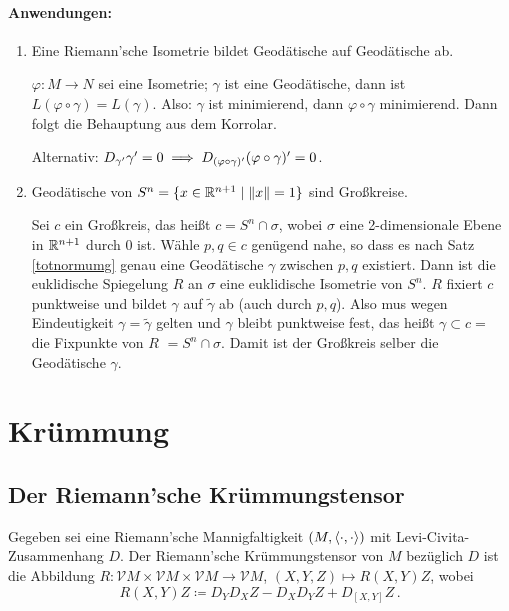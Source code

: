 \documentclass[a4paper,twoside,DIV15,BCOR12mm]{scrbook}
\renewcommand{\da}{\coloneqq}
\newcommand{\V}{\mathcal V}
\begin{document}
\subsubsection*{Anwendungen:}
\begin{enumerate}
\item Eine Riemann’sche Isometrie bildet Geodätische auf Geodätische ab.
\begin{beweis}
$\varphi: M \to N$ sei eine Isometrie; $\gamma$ ist eine Geodätische, dann ist $L(\varphi \circ \gamma) = L(\gamma)$. Also: $\gamma$ ist minimierend, dann $\varphi\circ \gamma$ minimierend. Dann folgt die Behauptung aus dem Korrolar.

Alternativ: $D_{\gamma'}{\gamma'} = 0 \implies D_{(\varphi\circ \gamma)'}(\varphi\circ\gamma)' = 0$.
\end{beweis}
\item Geodätische von $S^n=\{x \in \mathbb{R}^{n+1}\mid \|x\| = 1\}$ sind Großkreise.
\begin{beweis}
Sei $c$ ein Großkreis, das heißt $c = S^n \cap \sigma$, wobei $\sigma$ eine 2-dimensionale Ebene in $\mathbb{R}^{n+1}$ durch 0 ist. Wähle $p,q\in c$ genügend nahe, so dass es nach Satz \ref{totnormumg} genau eine Geodätische $\gamma$ zwischen $p,q$ existiert. Dann ist die euklidische Spiegelung $R$ an $\sigma$ eine euklidische Isometrie von $S^n$. $R$ fixiert $c$ punktweise und bildet $\gamma$  auf $\tilde\gamma$ ab (auch durch $p,q$). Also mus wegen Eindeutigkeit $\gamma = \tilde \gamma$ gelten und $\gamma$ bleibt punktweise fest, das heißt $\gamma\subset c = $ die Fixpunkte von $R$ $= S^n\cap \sigma$. Damit ist der Großkreis selber die Geodätische $\gamma$.
\end{beweis}
\end{enumerate}

\chapter{Krümmung}


\section{Der Riemann’sche Krümmungstensor}

Gegeben sei eine Riemann’sche Mannigfaltigkeit $(M,\langle\cdot,\cdot\rangle)$ mit Levi-Civita-Zusammenhang $D$. Der Riemann’sche Krümmungstensor von $M$ bezüglich $D$ ist die Abbildung $R:\V M\times \V M \times \V M \to \V M$, $(X,Y,Z) \mapsto R(X,Y)Z$, wobei \[R(X,Y)Z \da D_YD_XZ - D_XD_YZ + D_{[X,Y]}Z\,.\]
\end{document}
